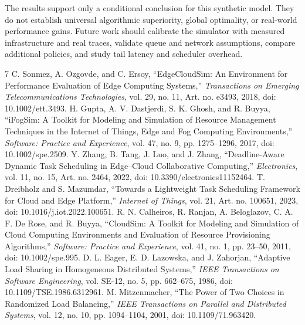 \documentclass[conference]{IEEEtran}
\begin{document}
The results support only a conditional conclusion for this synthetic model. They do not establish universal algorithmic superiority, global optimality, or real-world performance gains. Future work should calibrate the simulator with measured infrastructure and real traces, validate queue and network assumptions, compare additional policies, and study tail latency and scheduler overhead.

\begin{thebibliography}{7}
 C. Sonmez, A. Ozgovde, and C. Ersoy, ``EdgeCloudSim: An Environment for Performance Evaluation of Edge Computing Systems,'' \emph{Transactions on Emerging Telecommunications Technologies}, vol. 29, no. 11, Art. no. e3493, 2018, doi: 10.1002/ett.3493.
 H. Gupta, A. V. Dastjerdi, S. K. Ghosh, and R. Buyya, ``iFogSim: A Toolkit for Modeling and Simulation of Resource Management Techniques in the Internet of Things, Edge and Fog Computing Environments,'' \emph{Software: Practice and Experience}, vol. 47, no. 9, pp. 1275--1296, 2017, doi: 10.1002/spe.2509.
 Y. Zhang, B. Tang, J. Luo, and J. Zhang, ``Deadline-Aware Dynamic Task Scheduling in Edge--Cloud Collaborative Computing,'' \emph{Electronics}, vol. 11, no. 15, Art. no. 2464, 2022, doi: 10.3390/electronics11152464.
 T. Dreibholz and S. Mazumdar, ``Towards a Lightweight Task Scheduling Framework for Cloud and Edge Platform,'' \emph{Internet of Things}, vol. 21, Art. no. 100651, 2023, doi: 10.1016/j.iot.2022.100651.
 R. N. Calheiros, R. Ranjan, A. Beloglazov, C. A. F. De Rose, and R. Buyya, ``CloudSim: A Toolkit for Modeling and Simulation of Cloud Computing Environments and Evaluation of Resource Provisioning Algorithms,'' \emph{Software: Practice and Experience}, vol. 41, no. 1, pp. 23--50, 2011, doi: 10.1002/spe.995.
 D. L. Eager, E. D. Lazowska, and J. Zahorjan, ``Adaptive Load Sharing in Homogeneous Distributed Systems,'' \emph{IEEE Transactions on Software Engineering}, vol. SE-12, no. 5, pp. 662--675, 1986, doi: 10.1109/TSE.1986.6312961.
 M. Mitzenmacher, ``The Power of Two Choices in Randomized Load Balancing,'' \emph{IEEE Transactions on Parallel and Distributed Systems}, vol. 12, no. 10, pp. 1094--1104, 2001, doi: 10.1109/71.963420.
\end{thebibliography}
\end{document}
